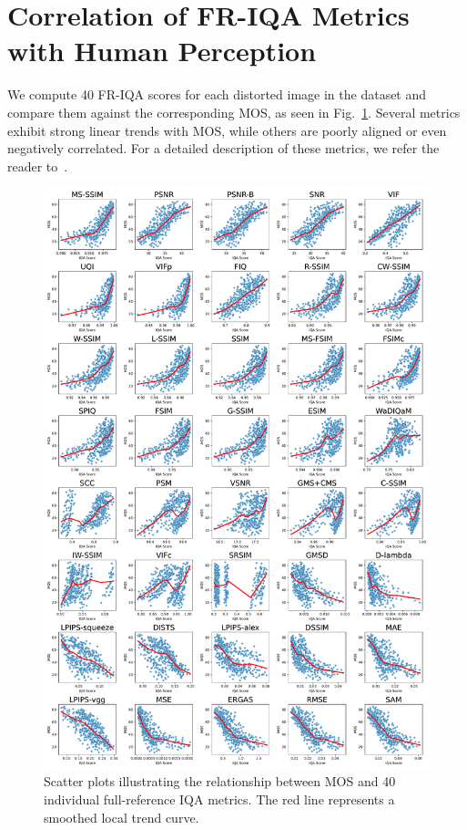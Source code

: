 \section{Correlation of FR-IQA Metrics with Human Perception}

We compute 40 FR-IQA scores for each distorted image in the dataset and compare them against the corresponding MOS, as seen in Fig.~\ref{fig:mos_vs_iqa}. Several metrics exhibit strong linear trends with MOS, while others are poorly aligned or even negatively correlated. For a detailed description of these metrics, we refer the reader to~\cite{shahrukh2019survey}.



\begin{figure}
    \centering
    \includegraphics[width=0.90\linewidth]{images/mos_vs_iqa_grid.pdf}
    \caption{Scatter plots illustrating the relationship between MOS and 40 individual full-reference IQA metrics. The red line represents a smoothed local trend curve.}\label{fig:mos_vs_iqa}
\end{figure}

